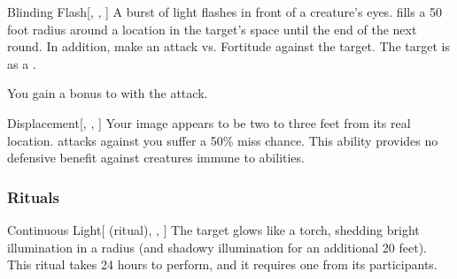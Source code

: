 \lowercase{\hypertarget{spell:Blinding Flash}{}}\label{spell:Blinding Flash}
\begin{freeability}[Rank 6]{\hypertarget{spell:Blinding Flash}{Blinding Flash}}[, , ]
A burst of light flashes in front of a creature's eyes.
 fills a 50 foot radius around a location in the target's space until the end of the next round.
In addition, make an attack vs. Fortitude against the target.
\hit The target is  as a .

\rankline
{} You gain a  bonus to  with the attack.

\end{freeability}
\vspace{0.25em}



\lowercase{\hypertarget{spell:Displacement}{}}\label{spell:Displacement}
\begin{freeability}[Rank 8]{\hypertarget{spell:Displacement}{Displacement}}[, , ]
Your image appears to be two to three feet from its real location.
  attacks against you suffer a 50\% miss chance.
This ability provides no defensive benefit against creatures immune to  abilities.

\end{freeability}
\vspace{0.25em}



\subsubsection{Rituals}


\lowercase{\hypertarget{spell:Continuous Light}{}}\label{spell:Continuous Light}
\begin{attuneability}[Rank 1]{\hypertarget{spell:Continuous Light}{Continuous Light}}[ (ritual), , ]
The target glows like a torch, shedding bright illumination in a \areamed radius (and shadowy illumination for an additional 20 feet).
This ritual takes 24 hours to perform, and it requires one  from its participants.
\end{attuneability}
\vspace{0.25em}



